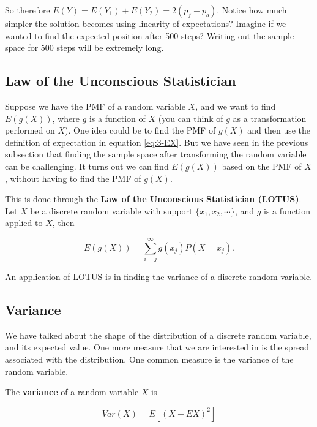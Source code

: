\documentclass[
]{book}
\begin{document}
So therefore \(E(Y) = E(Y_1) + E(Y_2) = 2(p_f - p_b)\). Notice how much simpler the solution becomes using linearity of expectations? Imagine if we wanted to find the expected position after 500 steps? Writing out the sample space for 500 steps will be extremely long.

\subsection{Law of the Unconscious Statistician}\label{law-of-the-unconscious-statistician}

Suppose we have the PMF of a random variable \(X\), and we want to find \(E(g(X))\), where \(g\) is a function of \(X\) (you can think of \(g\) as a transformation performed on \(X\)). One idea could be to find the PMF of \(g(X)\) and then use the definition of expectation in equation \eqref{eq:3-EX}. But we have seen in the previous subsection that finding the sample space after transforming the random variable can be challenging. It turns out we can find \(E(g(X))\) based on the PMF of \(X\), without having to find the PMF of \(g(X)\).

This is done through the \textbf{Law of the Unconscious Statistician (LOTUS)}. Let \(X\) be a discrete random variable with support \(\{x_1, x_2, \cdots \}\), and \(g\) is a function applied to \(X\), then

\begin{equation} 
E(g(X)) = \sum_{i=j}^{\infty} g(x_j) P(X=x_j).
\label{eq:3-lotus}
\end{equation}

An application of LOTUS is in finding the variance of a discrete random variable.

\subsection{Variance}\label{variance}

We have talked about the shape of the distribution of a discrete random variable, and its expected value. One more measure that we are interested in is the spread associated with the distribution. One common measure is the variance of the random variable.

The \textbf{variance} of a random variable \(X\) is

\begin{equation} 
Var(X) = E[(X - EX)^2]
\label{eq:3-var2}
\end{equation}
\end{document}
